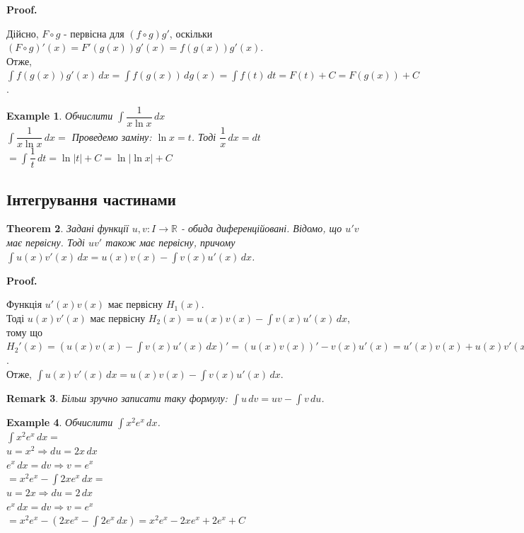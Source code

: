 \documentclass[a4paper, 10pt]{article}
\makeatletter
\def\huge{\displaystyle}
\def\qed{$\blacksquare$}
\theoremstyle{theoremdd}
\newtheorem{theorem}{Theorem}[subsection]
\theoremstyle{theoremdd}
\theoremstyle{theoremdd}
\theoremstyle{theoremdd}
\newtheorem{example}[theorem]{Example}
\theoremstyle{theoremdd}
\theoremstyle{theoremdd}
\newtheorem{remark}[theorem]{Remark}
\theoremstyle{theoremdd}
\theoremstyle{theoremdd}
\renewenvironment{proof}[1][Proof.\\]{\par
\pushQED{\hfill \qed}%
\normalfont \topsep6\p@\@plus6\p@\relax
\trivlist
\item\relax
{\bfseries
#1\@addpunct{.}}\hspace\labelsep\ignorespaces
}{%
\popQED\endtrivlist\@endpefalse
}
\makeatother
\begin{document}
\begin{proof}
Дійсно, $F \circ g$ - первісна для $(f \circ g) g'$, оскільки $(F \circ g)' (x) = F'(g(x)) g'(x) = f(g(x))g'(x)$. \\
Отже, $\huge \int f(g(x)) g'(x)\,dx = \int f(g(x)) \,dg(x) = \int f(t) \,dt = F(t) + C = F(g(x)) + C$.
\end{proof}

\begin{example} Обчислити $\huge \int \dfrac{1}{x \ln x} \,dx$\\
$\huge \int \dfrac{1}{x \ln x} \,dx \boxed{=} $ \hspace{2cm} Проведемо заміну: $\ln x = t$. Тоді $\dfrac{1}{x}\,dx = dt$\\
$\boxed{=} \huge \int \dfrac{1}{t}\,dt = \ln |t| + C = \ln |\ln x| + C$
\end{example}

\subsection{Інтегрування частинами}
\begin{theorem}
Задані функції $u,v: I \to \mathbb{R}$ - обида диференційовані. Відомо, що $u'v$ має первісну. Тоді $uv'$ також має первісну, причому\\
$\huge\int u(x)v'(x)\,dx = u(x)v(x) - \int v(x)u'(x)\,dx$.
\end{theorem}

\begin{proof}
Функція $u'(x)v(x)$ має первісну $H_1(x)$.\\
Тоді $u(x)v'(x)$ має первісну $H_2(x) = \huge u(x)v(x) - \int v(x)u'(x)\,dx$, тому що \\
$H_2'(x) = \huge \left( u(x)v(x) - \int v(x)u'(x)\,dx \right)' = (u(x)v(x))' - v(x)u'(x) = u'(x)v(x) + u(x)v'(x) - v(x)u'(x) = u(x)v'(x)$.\\
Отже, $\huge\int u(x)v'(x)\,dx = u(x)v(x) - \int v(x)u'(x)\,dx$.
\end{proof}

\begin{remark}
Більш зручно записати таку формулу: $\huge \int u\,dv = uv - \int v\,du$.
\end{remark}

\begin{example}
Обчислити $\huge \int x^2 e^x \,dx$.\\
$\huge \int x^2 e^x \,dx \boxed{=}$\\
$u = x^2 \Rightarrow du = 2x\,dx$\\
$e^x\,dx = dv \Rightarrow v = e^x$\\
$\boxed{=} x^2 e^x - \huge \int 2x e^x\,dx \boxed{\boxed{=}}$\\
$u = 2x \Rightarrow du = 2\,dx$\\
$e^x\,dx = dv \Rightarrow v = e^x$\\
$\boxed{\boxed{=}} x^2 e^x - (2xe^x - \huge \int 2e^x \,dx) = x^2 e^x - 2xe^x + 2e^x + C$
\end{example}
\end{document}
